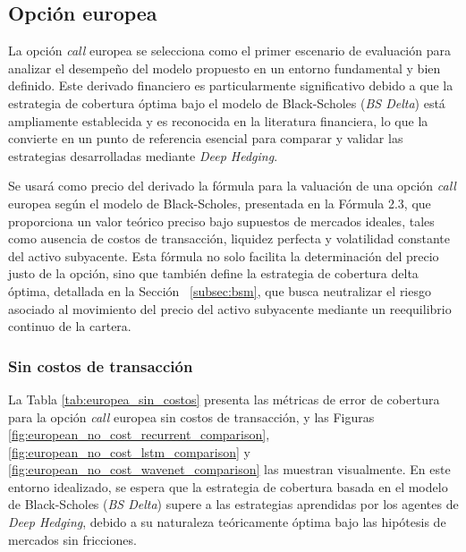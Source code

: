 \documentclass[11pt,a4paper,spanish]{article}
\numberwithin{equation}{section} %
\begin{document}
\subsection{Opción europea}

La opción \textit{call} europea se selecciona como el primer escenario de evaluación para analizar el desempeño del modelo propuesto en un entorno fundamental y bien definido. Este derivado financiero es particularmente significativo debido a que la estrategia de cobertura óptima bajo el modelo de Black-Scholes (\textit{BS Delta}) está ampliamente establecida y es reconocida en la literatura financiera, lo que la convierte en un punto de referencia esencial para comparar y validar las estrategias desarrolladas mediante \textit{Deep Hedging}.

Se usará como precio del derivado la fórmula para la valuación de una opción \textit{call} europea según el modelo de Black-Scholes, presentada en la Fórmula 2.3, que proporciona un valor teórico preciso bajo supuestos de mercados ideales, tales como ausencia de costos de transacción, liquidez perfecta y volatilidad constante del activo subyacente. Esta fórmula no solo facilita la determinación del precio justo de la opción, sino que también define la estrategia de cobertura delta óptima, detallada en la Sección  ~\ref{subsec:bsm}, que busca neutralizar el riesgo asociado al movimiento del precio del activo subyacente mediante un reequilibrio continuo de la cartera.


\subsubsection{Sin costos de transacción}

La Tabla \ref{tab:europea_sin_costos} presenta las métricas de error de cobertura para la opción \textit{call} europea sin costos de transacción, y las Figuras \ref{fig:european_no_cost_recurrent_comparison}, \ref{fig:european_no_cost_lstm_comparison} y \ref{fig:european_no_cost_wavenet_comparison} las muestran visualmente. En este entorno idealizado, se espera que la estrategia de cobertura basada en el modelo de Black-Scholes (\textit{BS Delta}) supere a las estrategias aprendidas por los agentes de \textit{Deep Hedging}, debido a su naturaleza teóricamente óptima bajo las hipótesis de mercados sin fricciones.
\end{document}

